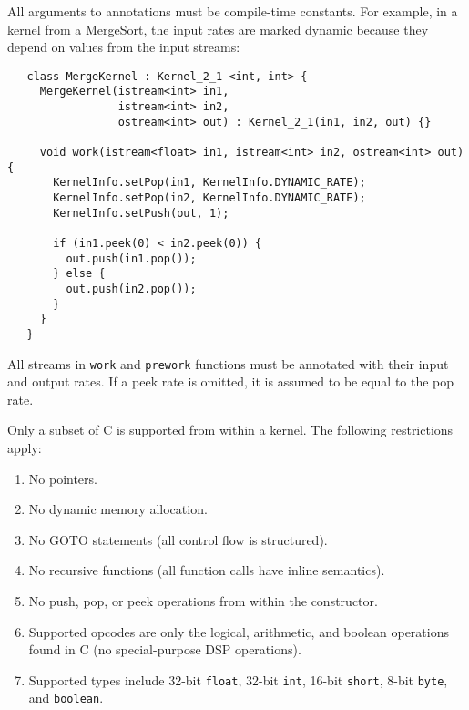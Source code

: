 All arguments to annotations must be compile-time constants.  For
example, in a kernel from a MergeSort, the input rates are marked
dynamic because they depend on values from the input streams:
\begin{verbatim}
   class MergeKernel : Kernel_2_1 <int, int> {
     MergeKernel(istream<int> in1, 
                 istream<int> in2, 
                 ostream<int> out) : Kernel_2_1(in1, in2, out) {}

     void work(istream<float> in1, istream<int> in2, ostream<int> out) {
       KernelInfo.setPop(in1, KernelInfo.DYNAMIC_RATE);
       KernelInfo.setPop(in2, KernelInfo.DYNAMIC_RATE);
       KernelInfo.setPush(out, 1);

       if (in1.peek(0) < in2.peek(0)) {
         out.push(in1.pop());
       } else {
         out.push(in2.pop());
       }
     }
   }  
\end{verbatim}

All streams in {\tt work} and {\tt prework} functions must be
annotated with their input and output rates.  If a peek rate is
omitted, it is assumed to be equal to the pop rate.


Only a subset of C is supported from within a kernel.  The following
restrictions apply:

\begin{enumerate}

\item No pointers.

\item No dynamic memory allocation.

\item No GOTO statements (all control flow is structured).

\item No recursive functions (all function calls have inline
semantics).

\item No push, pop, or peek operations from within the constructor.

\item Supported opcodes are only the logical, arithmetic, and boolean
operations found in C (no special-purpose DSP operations).

\item Supported types include 32-bit {\tt float}, 32-bit {\tt int},
16-bit {\tt short}, 8-bit {\tt byte}, and {\tt boolean}.

\end{enumerate}

